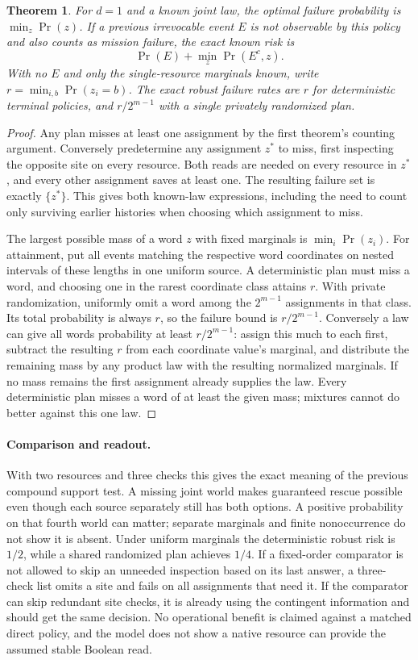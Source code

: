 \documentclass[11pt]{article}
\newtheorem{theorem}{Theorem}
\begin{document}
\begin{theorem}
For $d=1$ and a known joint law, the optimal failure probability is $\min_z\Pr(z)$. If a previous irrevocable event $E$ is not observable by this policy and also counts as mission failure, the exact known risk is
\[
 \Pr(E)+\min_z\Pr(E^c,z).
\]
With no $E$ and only the single-resource marginals known, write $r=\min_{i,b}\Pr(z_i=b)$. The exact robust failure rates are $r$ for deterministic terminal policies, and $r/2^{m-1}$ with a single privately randomized plan.
\end{theorem}

\begin{proof}
Any plan misses at least one assignment by the first theorem's counting argument. Conversely predetermine any assignment $z^*$ to miss, first inspecting the opposite site on every resource. Both reads are needed on every resource in $z^*$, and every other assignment saves at least one. The resulting failure set is exactly $\{z^*\}$. This gives both known-law expressions, including the need to count only surviving earlier histories when choosing which assignment to miss.

The largest possible mass of a word $z$ with fixed marginals is $\min_i\Pr(z_i)$. For attainment, put all events matching the respective word coordinates on nested intervals of these lengths in one uniform source. A deterministic plan must miss a word, and choosing one in the rarest coordinate class attains $r$. With private randomization, uniformly omit a word among the $2^{m-1}$ assignments in that class. Its total probability is always $r$, so the failure bound is $r/2^{m-1}$. Conversely a law can give all words probability at least $r/2^{m-1}$: assign this much to each first, subtract the resulting $r$ from each coordinate value's marginal, and distribute the remaining mass by any product law with the resulting normalized marginals. If no mass remains the first assignment already supplies the law. Every deterministic plan misses a word of at least the given mass; mixtures cannot do better against this one law.
\end{proof}

\paragraph{Comparison and readout.}
With two resources and three checks this gives the exact meaning of the previous compound support test. A missing joint world makes guaranteed rescue possible even though each source separately still has both options. A positive probability on that fourth world can matter; separate marginals and finite nonoccurrence do not show it is absent. Under uniform marginals the deterministic robust risk is $1/2$, while a shared randomized plan achieves $1/4$. If a fixed-order comparator is not allowed to skip an unneeded inspection based on its last answer, a three-check list omits a site and fails on all assignments that need it. If the comparator can skip redundant site checks, it is already using the contingent information and should get the same decision. No operational benefit is claimed against a matched direct policy, and the model does not show a native resource can provide the assumed stable Boolean read.
\end{document}
